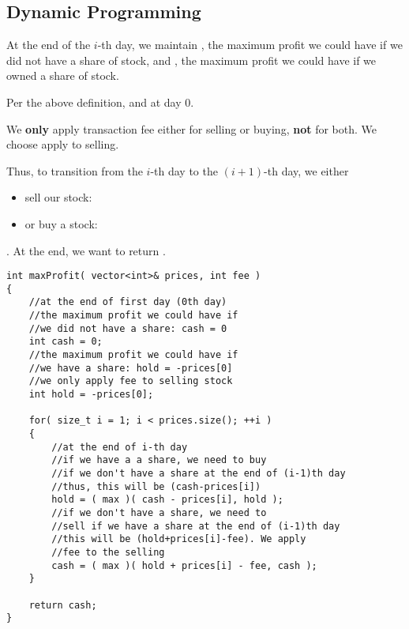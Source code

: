 \subsection{Dynamic Programming}
At the end of the $i$-th day, we maintain , the maximum profit we could have if we did not have a share of stock, and , the maximum profit we could have if we owned a share of stock.

Per the above definition,  and  at day 0.

We \textbf{only} apply transaction fee either for selling or buying, \textbf{not} for both. We choose apply to selling.

Thus, to transition from the $i$-th day to the $ (i+1) $-th day, we either \begin{itemize}
\item sell our stock:  \item or buy a stock: 
\end{itemize}. 
At the end, we want to return . 

\setcounter{lstlisting}{0}
\begin{lstlisting}[style=customc, caption={DP}]
int maxProfit( vector<int>& prices, int fee )
{
    //at the end of first day (0th day)
    //the maximum profit we could have if
    //we did not have a share: cash = 0
    int cash = 0;
    //the maximum profit we could have if
    //we have a share: hold = -prices[0]
    //we only apply fee to selling stock
    int hold = -prices[0];

    for( size_t i = 1; i < prices.size(); ++i )
    {
        //at the end of i-th day
        //if we have a a share, we need to buy
        //if we don't have a share at the end of (i-1)th day
        //thus, this will be (cash-prices[i])
        hold = ( max )( cash - prices[i], hold );
        //if we don't have a share, we need to
        //sell if we have a share at the end of (i-1)th day
        //this will be (hold+prices[i]-fee). We apply
        //fee to the selling
        cash = ( max )( hold + prices[i] - fee, cash );
    }

    return cash;
}
\end{lstlisting}


